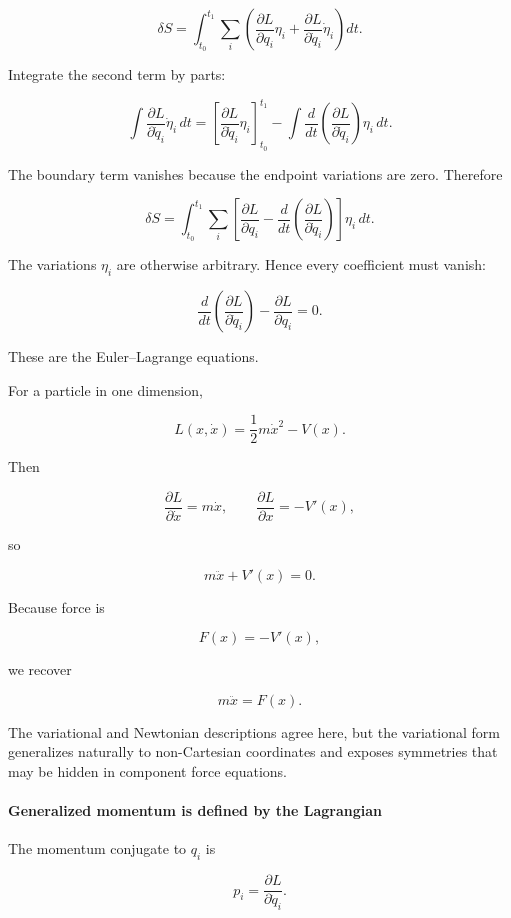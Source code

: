 \[
\delta S
=
\int_{t_0}^{t_1}
\sum_i
\left(
\frac{\partial L}{\partial q_i}\eta_i
+
\frac{\partial L}{\partial \dot q_i}\dot\eta_i
\right)
dt.
\]

Integrate the second term by parts:

\[
\int
\frac{\partial L}{\partial\dot q_i}
\dot\eta_i\,dt
=
\left[
\frac{\partial L}{\partial\dot q_i}\eta_i
\right]_{t_0}^{t_1}
-
\int
\frac{d}{dt}
\left(
\frac{\partial L}{\partial\dot q_i}
\right)\eta_i\,dt.
\]

The boundary term vanishes because the endpoint variations are zero. Therefore

\[
\delta S
=
\int_{t_0}^{t_1}
\sum_i
\left[
\frac{\partial L}{\partial q_i}
-
\frac{d}{dt}
\left(
\frac{\partial L}{\partial\dot q_i}
\right)
\right]
\eta_i\,dt.
\]

The variations \(\eta_i\) are otherwise arbitrary. Hence every coefficient must vanish:

\[
\boxed{
\frac{d}{dt}
\left(
\frac{\partial L}{\partial\dot q_i}
\right)
-
\frac{\partial L}{\partial q_i}
=
0
}.
\]

These are the Euler--Lagrange equations.

For a particle in one dimension,

\[
L(x,\dot x)=\frac12m\dot x^2-V(x).
\]

Then

\[
\frac{\partial L}{\partial\dot x}=m\dot x,
\qquad
\frac{\partial L}{\partial x}=-V'(x),
\]

so

\[
m\ddot x+V'(x)=0.
\]

Because force is

\[
F(x)=-V'(x),
\]

we recover

\[
m\ddot x=F(x).
\]

The variational and Newtonian descriptions agree here, but the variational form generalizes naturally to non-Cartesian coordinates and exposes symmetries that may be hidden in component force equations.

\paragraph{Generalized momentum is defined by the Lagrangian}\label{02-foundations-ii-ch025-generalized-momentum-is-defined-by-the-lagrangian}

The momentum conjugate to \(q_i\) is

\[
\boxed{
p_i
=
\frac{\partial L}{\partial\dot q_i}
}.
\]

